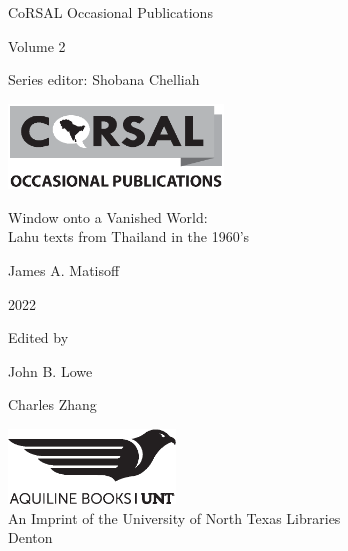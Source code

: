 \thispagestyle{empty}
\begin{center}

\vspace{4cm}
{\Large CoRSAL Occasional Publications}

\vspace{2cm}

{\Large Volume 2}

\vspace{8cm}

Series editor: Shobana Chelliah

\includegraphics[width=2.25in]{CoRSALBWlogo}\\

\end{center}
\clearpage{\thispagestyle{empty}\cleardoublepage}
\begin{center}
\thispagestyle{empty}
\vspace{4cm}
{\huge Window onto a Vanished World:\\\vspace{.75em}Lahu texts from Thailand in the 1960’s}

\vspace{3cm}

{\Large James A. Matisoff}
\vspace{2cm}

2022

\vspace{2cm}

Edited by

John B. Lowe

Charles Zhang

\vspace{4cm}
\includegraphics[width=1.75in]{AquilineBooksUNT.eps}\\
\vspace{1cm}
An Imprint of the University of North Texas Libraries\\
\vspace{1cm}
Denton
\end{center}
